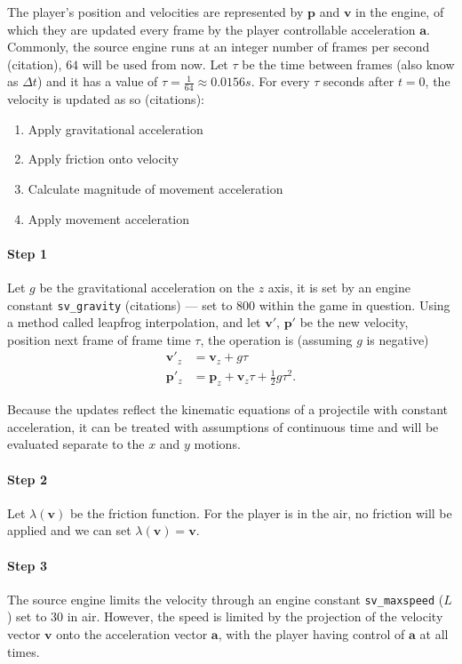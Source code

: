 \documentclass[a4paper,12pt]{article}
\newcommand{\tvec}[1]{\boldsymbol{#1}}
\newcommand{\ta}{\tvec{a}}
\newcommand{\tv}{\tvec{v}}
\newcommand{\tp}{\tvec{p}}
\begin{document}
The player's position and velocities are represented by $\tp$ and $\tv$ in the engine, of which they are updated every frame by the player controllable acceleration $\ta$. Commonly, the source engine runs at an integer number of frames per second (citation), $64$ will be used from now. Let $\tau$ be the time between frames (also know as $\Delta t$) and it has a value of $\tau = \frac{1}{64} \approx 0.0156 \si{s}$. For every $\tau$ seconds after $t=0$, the velocity is updated as so (citations):
\begin{enumerate}
    \item Apply gravitational acceleration
    \item Apply friction onto velocity
    \item Calculate magnitude of movement acceleration
    \item Apply movement acceleration
\end{enumerate}

\paragraph{Step 1} Let $g$ be the gravitational acceleration on the $z$ axis, it is set by an engine constant \verb|sv_gravity| (citations) --- set to $800$ within the game in question. Using a method called leapfrog interpolation, and let $\tv'$, $\tp'$ be the new velocity, position next frame of frame time $\tau$, the operation is (assuming $g$ is negative)
\begin{align*}
    \tv'_z &= \tv_z + g\tau\\
    \tp'_z &= \tp_z + \tv_z\tau + \frac{1}{2}g\tau^2.
\end{align*}

Because the updates reflect the kinematic equations of a projectile with constant acceleration, it can be treated with assumptions of continuous time and will be evaluated separate to the $x$ and $y$ motions.


\paragraph{Step 2} Let $\lambda(\tv)$ be the friction function. For the player is in the air, no friction will be applied and we can set $\lambda(\tv) = \tv$.

\paragraph{Step 3} The source engine limits the velocity through an engine constant \verb|sv_maxspeed| ($L$) set to $30$ in air. However, the speed is limited by the projection of the velocity vector $\tv$ onto the acceleration vector $\ta$, with the player having control of $\ta$ at all times.
\end{document}
